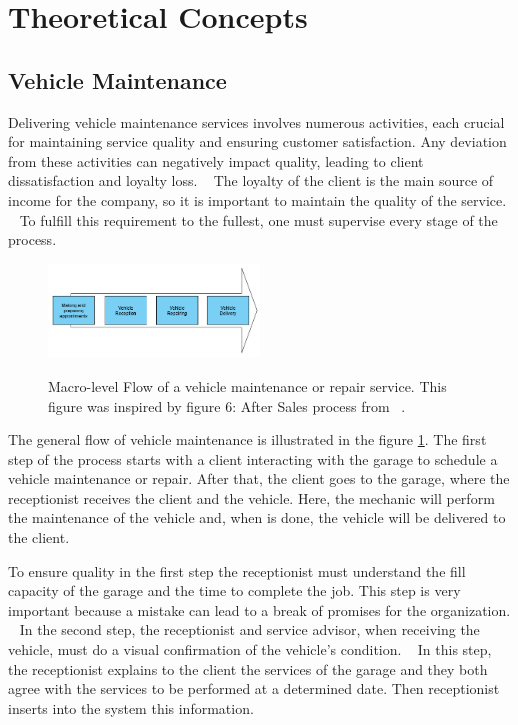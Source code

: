 \section{Theoretical Concepts}

\subsection{Vehicle Maintenance}

Delivering vehicle maintenance services involves numerous activities, each crucial for maintaining service quality and ensuring customer satisfaction. 
Any deviation from these activities can negatively impact quality, leading to client dissatisfaction and loyalty loss. ~\cite{Setting_the_after_sale_process}
The loyalty of the client is the main source of income for the company, so it is important to maintain the quality of the service. ~\cite{Setting_the_after_sale_process}
To fulfill this requirement to the fullest, one must supervise every stage of the process. ~\cite{Setting_the_after_sale_process}


\begin{figure}[h]
  \caption{Macro-level Flow of a vehicle maintenance or repair service. This figure was inspired by figure 6: After Sales process from ~\citet{Setting_the_after_sale_process}.}
  \centering
  \includegraphics[width=0.50\textwidth]{figs/Vehicle_maintenace_macro}
  \label{fig:Vehicle_maintenace_macro}
\end{figure}

The general flow of vehicle maintenance is illustrated in the figure \ref{fig:Vehicle_maintenace_macro}. 
The first step of the process starts with a client interacting with the garage to schedule a vehicle maintenance or repair. 
After that, the client goes to the garage, where the receptionist receives the client and the vehicle.
Here, the mechanic will perform the maintenance of the vehicle and, when is done, the vehicle will be delivered to the client.

To ensure quality in the first step the receptionist must understand the fill capacity of the garage and the time to complete the job. 
This step is very important because a mistake can lead to a break of promises for the organization. ~\cite{Setting_the_after_sale_process}
In the second step, the receptionist and service advisor, when receiving the vehicle, must do a visual confirmation of the vehicle's condition. ~\cite{Setting_the_after_sale_process}
In this step, the receptionist explains to the client the services of the garage and they both agree with the services to be performed at a determined date. 
Then receptionist inserts into the system this information. ~\cite{Setting_the_after_sale_process}

